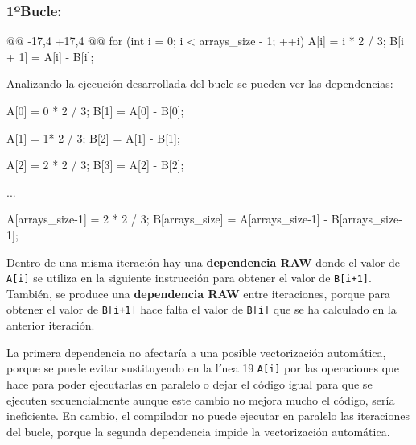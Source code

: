 \subsubsection{\textbf{1ºBucle:}}
\begin{listing}[firstnumber=16]
    @@ -17,4 +17,4 @@
    for (int i = 0; i < arrays_size - 1; ++i) {
      A[i] = i * 2 / 3;
      B[i + 1] = A[i] - B[i];
    }
\end{listing}
\par Analizando la ejecución desarrollada del bucle se pueden ver las dependencias:
\newpage
\begin{listing}[numbers=none]
    A[0] = 0 * 2 / 3;
    B[1] = A[0] - B[0];

    A[1] = 1* 2 / 3;
    B[2] = A[1] - B[1];

    A[2] = 2 * 2 / 3;
    B[3] = A[2] - B[2];

            ...

    A[arrays_size-1] = 2 * 2 / 3;
    B[arrays_size] = A[arrays_size-1] - B[arrays_size-1];
\end{listing}
\par Dentro de una misma iteración hay una \textbf{dependencia RAW} donde el valor de \texttt{A[i]} se utiliza en la siguiente instrucción para
obtener el valor de \texttt{B[i+1]}. También, se produce una \textbf{dependencia RAW} entre iteraciones, porque para obtener el valor de \texttt{B[i+1]}
hace falta el valor de \texttt{B[i]} que se ha calculado en la anterior iteración.
\par La primera dependencia no afectaría a una posible vectorización automática, porque se puede evitar sustituyendo en la línea 19
\texttt{A[i]} por las operaciones que hace para poder ejecutarlas en paralelo o dejar el código igual para que se ejecuten secuencialmente
aunque este cambio no mejora mucho el código, sería ineficiente. En cambio, el compilador no puede ejecutar en paralelo las
iteraciones del bucle, porque la segunda dependencia impide la vectorización automática.